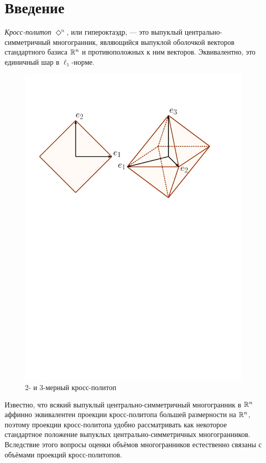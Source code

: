 \documentclass[a4paper,12pt]{article}
\newcommand{\crosp}{\Diamond}
\numberwithin{equation}{section}
\begin{document}
	\tableofcontents
	\newpage

	\section{Введение}
	\textit{Кросс-политоп} $\crosp^n$, или гипероктаэдр, --- это выпуклый центрально-симметричный многогранник, являющийся выпуклой оболочкой векторов стандартного базиса $\mathbb {R}^n$ и противоположных к ним векторов. Эквивалентно, это единичный шар в $\ell_1$-норме.
	\begin{figure}[h!]
		\begin{center}
		\includegraphics[scale=0.5]{pics/crosp.pdf}
		\caption{2- и 3-мерный кросс-политоп}
		\end{center}
	\end{figure}

	Известно, что всякий выпуклый центрально-симметричный многогранник в $\mathbb {R}^n$ аффинно эквивалентен проекции кросс-политопа большей размерности на $\mathbb {R}^n$, поэтому проекции кросс-политопа удобно рассматривать как некоторое стандартное положение выпуклых центрально-симметричных многогранников. Вследствие этого вопросы оценки объёмов многогранников естественно связаны с объёмами проекций кросс-политопов.
\end{document}
